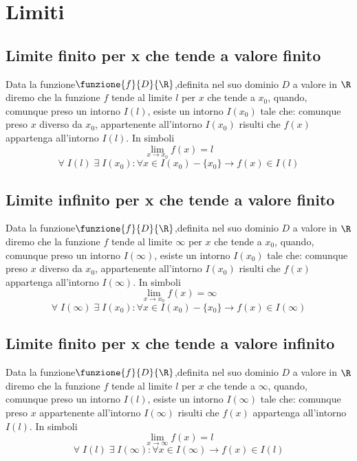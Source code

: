 \chapter{Limiti}
\section{Limite finito per x che tende a valore finito}
Data la funzione$\funzione{f}{D}{\R}$,definita nel suo dominio $D$ a valore in $\R$  diremo che la funzione $f$ tende al limite $l$ per $x$ che tende a $x_0$, quando, comunque preso un intorno $I(l)$, esiste un intorno $I(x_0)$ tale che: comunque preso $x$ diverso da $x_0$, appartenente  all'intorno $I(x_0)$ risulti che $f(x)$ appartenga all'intorno $I(l)$. In simboli
\begin{equation*}
\lim_{x\to x_0}f(x)=l
\end{equation*}
\begin{equation*}
\forall\; I(l)\; \exists\; I(x_0) : \forall x\in I(x_0)-\lbrace x_0\rbrace \longrightarrow f(x)\in I(l)
\end{equation*}
\section{Limite infinito per x che tende a valore finito}
Data la funzione$\funzione{f}{D}{\R}$,definita nel suo dominio $D$ a valore in $\R$  diremo che la funzione $f$ tende al limite $\infty$ per $x$ che tende a $x_0$, quando, comunque preso un intorno $I(\infty)$, esiste un intorno $I(x_0)$ tale che: comunque preso $x$ diverso da $x_0$, appartenente  all'intorno $I(x_0)$ risulti che $f(x)$ appartenga all'intorno $I(\infty)$. In simboli
\begin{equation*}
\lim_{x\to x_0}f(x)=\infty
\end{equation*}
\begin{equation*}
\forall\; I(\infty)\; \exists\; I(x_0) : \forall x\in I(x_0)-\lbrace x_0\rbrace \longrightarrow f(x)\in I(\infty)
\end{equation*}
\section{Limite finito per x che tende a valore infinito}
Data la funzione$\funzione{f}{D}{\R}$,definita nel suo dominio $D$ a valore in $\R$  diremo che la funzione $f$ tende al limite $l$ per $x$ che tende a $\infty$, quando, comunque preso un intorno $I(l)$, esiste un intorno $I(\infty)$ tale che: comunque preso $x$ appartenente  all'intorno $I(\infty)$ risulti che $f(x)$ appartenga all'intorno $I(l)$. In simboli
\begin{equation*}
\lim_{x\to \infty}f(x)=l
\end{equation*}
\begin{equation*}
\forall\; I(l)\; \exists\; I(\infty) : \forall x\in I(\infty) \longrightarrow f(x)\in I(l)
\end{equation*}
